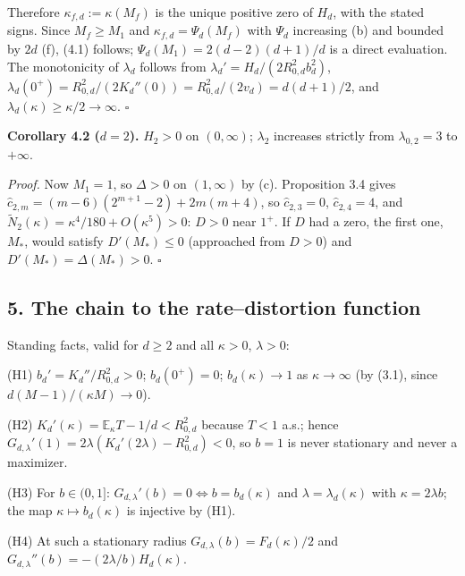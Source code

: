 \documentclass[
  11pt,
  a4paper,
]{article}
\begin{document}
Therefore \(\kappa_{f,\allowbreak{}d}:=\kappa(M_f)\) is the unique positive zero of
\(H_d\), with the stated signs. Since \(M_f\ge M_1\) and
\(\kappa_{f,\allowbreak{}d}=\Psi_d(M_f)\) with \(\Psi_d\) increasing (b) and bounded
by \(2d\) (f), (4.1) follows; \(\Psi_d(M_1)=2(d-2)(d+1)/d\) is a direct
evaluation. The monotonicity of \(\lambda_d\) follows from
\(\lambda_d'=H_d/(2R_{0,\allowbreak{}d}^2b_d^2)\),
\(\lambda_d(0^+)=R_{0,\allowbreak{}d}^2/(2K_d''(0))=R_{0,\allowbreak{}d}^2/(2v_d)=d(d+1)/2\), and
\(\lambda_d(\kappa)\ge\kappa/2\to\infty\). \(\square\)

\textbf{Corollary 4.2 (\(d=2\)).} \(H_2>0\) on \((0,\allowbreak{}\infty)\);
\(\lambda_2\) increases strictly from \(\lambda_{0,\allowbreak{}2}=3\) to
\(+\infty\).

\emph{Proof.} Now \(M_1=1\), so \(\Delta>0\) on \((1,\allowbreak{}\infty)\) by (c).
Proposition 3.4 gives \(\hat c_{2,\allowbreak{}m}=(m-6)(2^{m+1}-2)+2m(m+4)\), so
\(\hat c_{2,\allowbreak{}3}=0\), \(\hat c_{2,\allowbreak{}4}=4\), and
\(\tilde N_2(\kappa)=\kappa^4/180+O(\kappa^5)>0\): \(D>0\) near \(1^+\).
If \(D\) had a zero, the first one, \(M_*\), would satisfy
\(D'(M_*)\le0\) (approached from \(D>0\)) and \(D'(M_*)=\Delta(M_*)>0\).
\(\square\)

\subsection{5. The chain to the rate--distortion
function}\label{the-chain-to-the-ratedistortion-function}

Standing facts, valid for \(d\ge2\) and all \(\kappa>0\), \(\lambda>0\):

(H1) \(b_d'=K_d''/R_{0,\allowbreak{}d}^2>0\); \(b_d(0^+)=0\); \(b_d(\kappa)\to1\) as
\(\kappa\to\infty\) (by (3.1), since \(d(M-1)/(\kappa M)\to0\)).

(H2) \(K_d'(\kappa)=\mathbb E_\kappa T-1/d<R_{0,\allowbreak{}d}^2\) because \(T<1\)
a.s.; hence \(G_{d,\allowbreak{}\lambda}'(1)=2\lambda(K_d'(2\lambda)-R_{0,\allowbreak{}d}^2)<0\),
so \(b=1\) is never stationary and never a maximizer.

(H3) For \(b\in(0,\allowbreak{}1]\): \(G_{d,\allowbreak{}\lambda}'(b)=0\iff b=b_d(\kappa)\) and
\(\lambda=\lambda_d(\kappa)\) with \(\kappa=2\lambda b\); the map
\(\kappa\mapsto b_d(\kappa)\) is injective by (H1).

(H4) At such a stationary radius \(G_{d,\allowbreak{}\lambda}(b)=F_d(\kappa)/2\) and
\(G_{d,\allowbreak{}\lambda}''(b)=-(2\lambda/b)H_d(\kappa)\).
\end{document}

